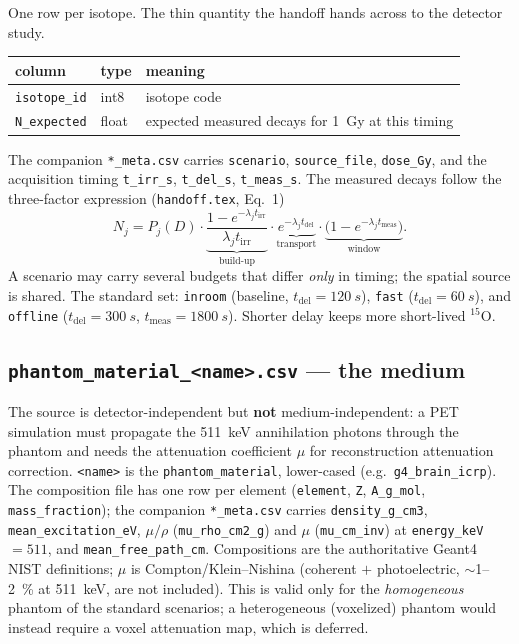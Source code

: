 \documentclass[11pt]{article}
\newcommand{\tirr}{t_{\mathrm{irr}}}
\newcommand{\tdel}{t_{\mathrm{del}}}
\newcommand{\tmeas}{t_{\mathrm{meas}}}
\newcommand{\file}[1]{\texttt{#1}}
\begin{document}
One row per isotope. The thin quantity the handoff hands across to the detector
study.

\begin{center}
\begin{tabular}{@{}lll@{}}
\toprule
column & type & meaning \\
\midrule
\file{isotope\_id} & int8 & isotope code \\
\file{N\_expected} & float & expected measured decays for \SI{1}{Gy} at this timing \\
\bottomrule
\end{tabular}
\end{center}

The companion \file{*\_meta.csv} carries \file{scenario}, \file{source\_file},
\file{dose\_Gy}, and the acquisition timing \file{t\_irr\_s}, \file{t\_del\_s},
\file{t\_meas\_s}. The measured decays follow the three-factor expression
(\file{handoff.tex}, Eq.~1)
\begin{equation}
  N_j = P_j(D)\cdot
        \underbrace{\frac{1-e^{-\lambda_j \tirr}}{\lambda_j \tirr}}_{\text{build-up}}\cdot
        \underbrace{e^{-\lambda_j \tdel}}_{\text{transport}}\cdot
        \underbrace{\bigl(1-e^{-\lambda_j \tmeas}\bigr)}_{\text{window}} .
  \label{eq:budget}
\end{equation}
A scenario may carry several budgets that differ \emph{only} in timing; the
spatial source is shared. The standard set: \file{inroom} (baseline,
$\tdel=\SI{120}{s}$), \file{fast} ($\tdel=\SI{60}{s}$), and \file{offline}
($\tdel=\SI{300}{s}$, $\tmeas=\SI{1800}{s}$). Shorter delay keeps more
short-lived $^{15}$O.

\subsection{\file{phantom\_material\_<name>.csv} --- the medium}

The source is detector-independent but \textbf{not} medium-independent: a PET
simulation must propagate the \SI{511}{keV} annihilation photons through the
phantom and needs the attenuation coefficient $\mu$ for reconstruction
attenuation correction. \file{<name>} is the \file{phantom\_material},
lower-cased (e.g.\ \file{g4\_brain\_icrp}). The composition file has one row per
element (\file{element}, \file{Z}, \file{A\_g\_mol}, \file{mass\_fraction}); the
companion \file{*\_meta.csv} carries \file{density\_g\_cm3},
\file{mean\_excitation\_eV}, $\mu/\rho$ (\file{mu\_rho\_cm2\_g}) and $\mu$
(\file{mu\_cm\_inv}) at \file{energy\_keV}$=511$, and \file{mean\_free\_path\_cm}.
Compositions are the authoritative Geant4 NIST definitions; $\mu$ is
Compton/Klein--Nishina (coherent $+$ photoelectric, $\sim$1--\SI{2}{\percent} at
\SI{511}{keV}, are not included). This is valid only for the \emph{homogeneous}
phantom of the standard scenarios; a heterogeneous (voxelized) phantom would
instead require a voxel attenuation map, which is deferred.
\end{document}
